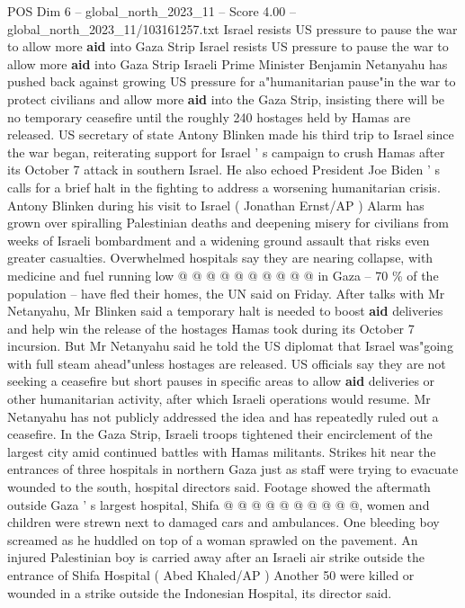 \begin{textsample}{POS Dim 6 – global\_north\_2023\_11 – Score 4.00 – global\_north\_2023\_11/103161257.txt}  \label{ex:f6_pos_219}
Israel resists US pressure to pause the war to allow more \textbf{aid} into Gaza Strip Israel resists US pressure to pause the war to allow more \textbf{aid} into Gaza Strip Israeli Prime Minister Benjamin Netanyahu has pushed back against growing US pressure for a"humanitarian pause"in the war to protect civilians and allow more \textbf{aid} into the Gaza Strip, insisting there will be no temporary ceasefire until the roughly 240 hostages held by Hamas are released.
US secretary of state Antony Blinken made his third trip to Israel since the war began, reiterating support for Israel ' s campaign to crush Hamas after its October 7 attack in southern Israel.
He also echoed President Joe Biden ' s calls for a brief halt in the fighting to address a worsening humanitarian crisis.
Antony Blinken during his visit to Israel ( Jonathan Ernst/AP ) Alarm has grown over spiralling Palestinian deaths and deepening misery for civilians from weeks of Israeli bombardment and a widening ground assault that risks even greater casualties.
Overwhelmed hospitals say they are nearing collapse, with medicine and fuel running low @ @ @ @ @ @ @ @ @ @ in Gaza -- 70 \% of the population -- have fled their homes, the UN said on Friday.
After talks with Mr Netanyahu, Mr Blinken said a temporary halt is needed to boost \textbf{aid} deliveries and help win the release of the hostages Hamas took during its October 7 incursion.
But Mr Netanyahu said he told the US diplomat that Israel was"going with full steam ahead"unless hostages are released.
US officials say they are not seeking a ceasefire but short pauses in specific areas to allow \textbf{aid} deliveries or other humanitarian activity, after which Israeli operations would resume.
Mr Netanyahu has not publicly addressed the idea and has repeatedly ruled out a ceasefire.
In the Gaza Strip, Israeli troops tightened their encirclement of the largest city amid continued battles with Hamas militants.
Strikes hit near the entrances of three hospitals in northern Gaza just as staff were trying to evacuate wounded to the south, hospital directors said.
Footage showed the aftermath outside Gaza ' s largest hospital, Shifa @ @ @ @ @ @ @ @ @ @, women and children were strewn next to damaged cars and ambulances.
One bleeding boy screamed as he huddled on top of a woman sprawled on the pavement.
An injured Palestinian boy is carried away after an Israeli air strike outside the entrance of Shifa Hospital ( Abed Khaled/AP ) Another 50 were killed or wounded in a strike outside the Indonesian Hospital, its director said.

\end{textsample}
